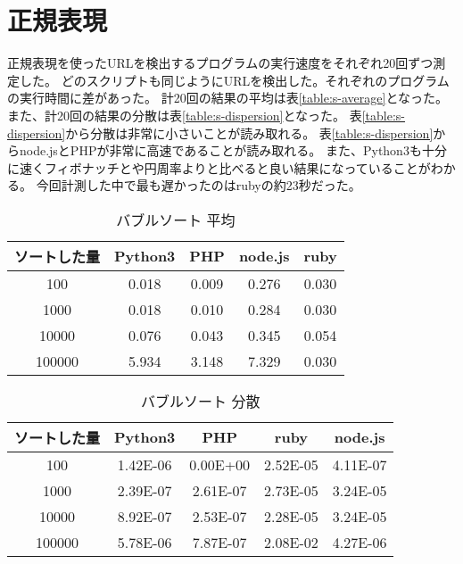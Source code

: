 \section{正規表現}
正規表現を使ったURLを検出するプログラムの実行速度をそれぞれ20回ずつ測定した。
どのスクリプトも同じようにURLを検出した。それぞれのプログラムの実行時間に差があった。
計20回の結果の平均は表\ref{table:s-average}となった。
また、計20回の結果の分散は表\ref{table:s-dispersion}となった。
表\ref{table:s-dispersion}から分散は非常に小さいことが読み取れる。
表\ref{table:s-dispersion}からnode.jsとPHPが非常に高速であることが読み取れる。
また、Python3も十分に速くフィボナッチとや円周率よりと比べると良い結果になっていることがわかる。
今回計測した中で最も遅かったのはrubyの約23秒だった。

\clearpage
\begin{table}[tb]
\centering
\begin{tabular}{|c||c|c|c|c|}
\hline
ソートした量&Python3&PHP&node.js&ruby\\ \hline
100	    &0.018	&0.009	&0.276	&0.030\\ \hline
1000	&0.018	&0.010	&0.284	&0.030\\ \hline
10000	&0.076	&0.043	&0.345	&0.054\\ \hline
100000	&5.934	&3.148	&7.329	&0.030\\ \hline
\end{tabular}
\caption{バブルソート 平均}
\label{table:b-average}
\end{table}

\begin{table}[tb]
\centering
\begin{tabular}{|c||c|c|c|c|}
\hline
ソートした量&Python3&PHP&ruby&node.js\\ \hline
100     &1.42E-06	&0.00E+00	&2.52E-05	&4.11E-07\\ \hline
1000	&2.39E-07	&2.61E-07	&2.73E-05	&3.24E-05\\ \hline
10000	&8.92E-07	&2.53E-07	&2.28E-05	&3.24E-05\\ \hline
100000	&5.78E-06	&7.87E-07	&2.08E-02	&4.27E-06\\ \hline
\end{tabular}
\caption{バブルソート 分散}
\label{table:b-dispersion}
\end{table}

